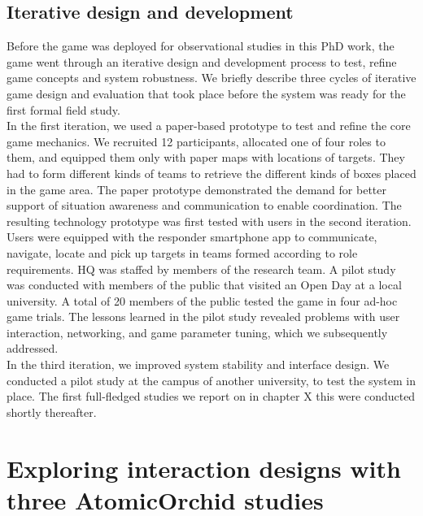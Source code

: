 \subsection{Iterative design and development}
Before the game was deployed for observational studies in this PhD work, the game went through an iterative design and development process to test, refine game concepts and system robustness. We briefly describe three cycles of iterative game design and evaluation that took place before the system was ready for the first formal field study.\\

In the first iteration, we used a paper-based prototype to test and refine the core game mechanics. We recruited 12 participants, allocated one of four roles to them, and equipped them only with paper maps with locations of targets. They had to form different kinds of teams to retrieve the different kinds of boxes placed in the game area. The paper prototype demonstrated the demand for better support of situation awareness and communication to enable coordination. The resulting technology prototype was first tested with users in the second iteration. Users were equipped with the responder smartphone app to communicate, navigate, locate and pick up targets in teams formed according to role requirements. HQ was staffed by members of the research team. A pilot study was conducted with members of the public that visited an Open Day at a local university. A total of 20 members of the public tested the game in four ad-hoc game trials. The lessons learned in the pilot study revealed problems with user interaction, networking, and game parameter tuning, which we subsequently addressed.\\

In the third iteration, we improved system stability and interface design. We conducted a pilot study at the campus of another university, to test the system in place. The first full-fledged studies we report on in chapter X this were conducted shortly thereafter.\\


\section{Exploring interaction designs with three AtomicOrchid studies}\label{sec:patterns} \label{sec:approachPatterns}



